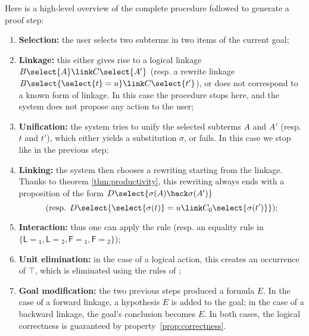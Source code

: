 Here is a high-level overview of the complete procedure followed to generate a
proof step:
\begin{enumerate}
\item \textbf{Selection:} the user selects two subterms in two items of the current goal; \label{step:selection}
\item \textbf{Linkage:} this either gives rise to a logical linkage $B\select{A}
  \link C\select{A'}$ (resp. a rewrite linkage $B\select{\select{t} = u} \link
  C\select{t'}$), or does not correspond to a known form of linkage. In this case
  the procedure stops here, and the system does not propose any action to the
  user; \label{step:linkage}
\item \textbf{Unification:} the system tries to unify the selected subterms $A$
  and $A'$ (resp. $t$ and $t'$), which either yields a substitution $\sigma$, or
  fails. In this case we stop like in the previous step;
  \label{step:unification}
\item \textbf{Linking:} the system then chooses a rewriting start\-ing from the linkage. Thanks to
  theorem \ref{thm:productivity}, this re\-writing always ends with a proposition of
  the form $D\select{\sigma(A) \back \sigma(A')}$ $$\text{(resp.
  $D\select{\select{\sigma(t)} = u \link C_0\select{\sigma(t')}}$);}$$
  \label{step:linking}
\item \textbf{Interaction:} thus one can apply the {} rule (resp. an equality rule in
$\{\mathsf{L\!\!=\!\!_1}, \mathsf{L\!\!=\!\!_2}, \mathsf{F\!\!=\!\!_1},
\mathsf{F\!\!=\!\!_2}\}$); \label{step:interaction}
\item \textbf{Unit elimination:} in the case of a logical action, this creates an occurrence of $\top$,
which is eliminated using the rules of ; \label{step:unit-elimination}
\item \textbf{Goal modification:} the two previous steps produced a formula $E$.
  In the case of a forward linkage, a hypothesis $E$ is added to the goal; in
  the case of a backward linkage, the goal's conclusion becomes $E$. In both
  cases, the logical correctness is guaranteed by
  property~\ref{prop:correctness}. \label{step:goal-modification}
\end{enumerate}

